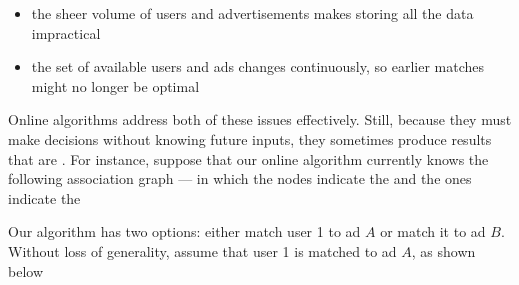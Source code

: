 \documentclass[a4paper, 12pt]{report}
\begin{document}
    \begin{itemize}
        \item the sheer volume of users and advertisements makes storing all the data impractical
        \item the set of available users and ads changes continuously, so earlier matches might no longer be optimal
    \end{itemize}

    Online algorithms address both of these issues effectively. Still, because they must make decisions without knowing future inputs, they sometimes produce results that are . For instance, suppose that our online algorithm currently knows the following association graph --- in which the  nodes indicate the  and the  ones indicate the 

    \begin{figure}[H]
        \centering
    \end{figure}

    Our algorithm has two options: either match user 1 to ad $A$ or match it to ad $B$. Without loss of generality, assume that user 1 is matched to ad $A$, as shown below

    \begin{figure}[H]
        \centering
    \end{figure}
\end{document}
